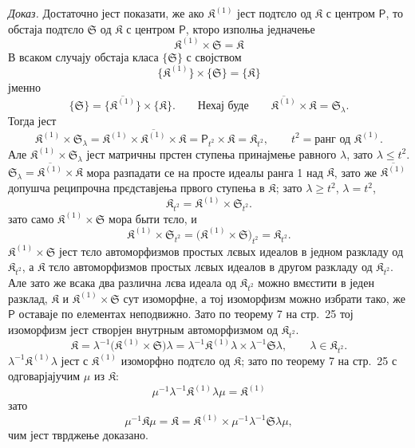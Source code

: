 \documentclass[11pt]{article}
\begin{document}
\emph{Доказ.} Достаточно јест показати, же ако \(\mathfrak K^{(1)}\) јест подтєло од \(\mathfrak K\) с центром \(\mathsf P\), то обстаја подтєло \(\mathfrak S\) од \(\mathfrak K\) с центром \(\mathsf P\), кторо изполња једначење
\[
\mathfrak K^{(1)}\times\mathfrak S=\mathfrak K
\]
В всаком случају обстаја класа \(\{\mathfrak S\}\) с својством
\[
\{\mathfrak K^{(1)}\}\times\{\mathfrak S\}=\{\mathfrak K\}
\]
јменно
\[
\{\mathfrak S\}=\{\overline{\mathfrak K^{(1)}}\}\times\{\mathfrak K\}.
\qquad
\text{Нехај буде}\qquad
\overline{\mathfrak K^{(1)}}\times\mathfrak K=\mathfrak S_\lambda.
\]
Тогда јест
\[
\mathfrak K^{(1)}\times\mathfrak S_\lambda
=\mathfrak K^{(1)}\times\overline{\mathfrak K^{(1)}}\times\mathfrak K
=\mathsf P_{t^2}\times\mathfrak K
=\mathfrak K_{t^2},
\qquad
t^2=\text{ранг од }\mathfrak K^{(1)}.
\]
Але \(\mathfrak K^{(1)}\times\mathfrak S_\lambda\) јест матричны прстен ступења принајмење равного \(\lambda\), зато \(\lambda\leq t^2\). \(\mathfrak S_\lambda=\overline{\mathfrak K^{(1)}}\times\mathfrak K\) мора разпадати се на просте идеалы ранга 1 над \(\mathfrak K\), зато же \(\overline{\mathfrak K^{(1)}}\) допушча реципрочна прєдставјења првого ступења в \(\mathfrak K\); зато \(\lambda\geq t^2\), \(\lambda=t^2\),
\[
\mathfrak K_{t^2}=\mathfrak K^{(1)}\times\mathfrak S_{t^2}.
\]
зато само \(\mathfrak K^{(1)}\times\mathfrak S\) мора быти тєло, и
\[
\mathfrak K^{(1)}\times\mathfrak S_{t^2}
=\bigl(\mathfrak K^{(1)}\times\mathfrak S\bigr)_{t^2}
=\mathfrak K_{t^2}.
\]
\(\mathfrak K^{(1)}\times\mathfrak S\) јест тєло автоморфизмов простых лєвых идеалов в једном разкладу од \(\mathfrak K_{t^2}\), а \(\mathfrak K\) тєло автоморфизмов простых лєвых идеалов в другом разкладу од \(\mathfrak K_{t^2}\). Але зато же всака два различна лєва идеала од \(\mathfrak K_{t^2}\) можно вмєстити в једен разклад, \(\mathfrak K\) и \(\mathfrak K^{(1)}\times\mathfrak S\) сут изоморфне, а тој изоморфизм можно избрати тако, же \(\mathsf P\) оставаје по елементах неподвижно. Зато по теорему 7 на стр.~25 тој изоморфизм јест створјен внутрным автоморфизмом од \(\mathfrak K_{t^2}\).
\[
\mathfrak K
=\lambda^{-1}\bigl(\mathfrak K^{(1)}\times\mathfrak S\bigr)\lambda
=\lambda^{-1}\mathfrak K^{(1)}\lambda\times\lambda^{-1}\mathfrak S\lambda,
\qquad
\lambda\in\mathfrak K_{t^2}.
\]
\(\lambda^{-1}\mathfrak K^{(1)}\lambda\) јест с \(\mathfrak K^{(1)}\) изоморфно подтєло од \(\mathfrak K\); зато по теорему 7 на стр.~25 с одговарјајучим \(\mu\) из \(\mathfrak K\):
\[
\mu^{-1}\lambda^{-1}\mathfrak K^{(1)}\lambda\mu=\mathfrak K^{(1)}
\]
зато
\[
\mu^{-1}\mathfrak K\mu
=\mathfrak K
=\mathfrak K^{(1)}\times\mu^{-1}\lambda^{-1}\mathfrak S\lambda\mu,
\]
чим јест тврджење доказано.
\end{document}
